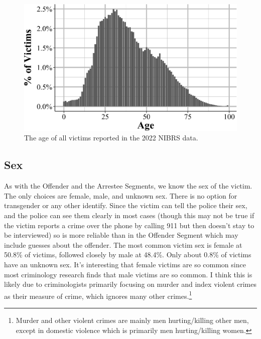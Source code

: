 \documentclass[
  12pt,
  openany]{book}
\begin{document}
\begin{figure}

{\centering \includegraphics[width=0.9\linewidth]{15_nibrs_victim_files/figure-latex/victimAge-1} 

}

\caption{The age of all victims reported in the 2022 NIBRS data.}\label{fig:victimAge}
\end{figure}

\subsection{Sex}\label{sex-2}

As with the Offender and the Arrestee Segments, we know the sex of the victim. The only choices are female, male, and unknown sex. There is no option for transgender or any other identify. Since the victim can tell the police their sex, and the police can see them clearly in most cases (though this may not be true if the victim reports a crime over the phone by calling 911 but then doesn't stay to be interviewed) so is more reliable than in the Offender Segment which may include guesses about the offender. The most common victim sex is female at 50.8\% of victims, followed closely by male at 48.4\%. Only about 0.8\% of victims have an unknown sex. It's interesting that female victims are so common since most criminology research finds that male victims are so common. I think this is likely due to criminologists primarily focusing on murder and index violent crimes as their measure of crime, which ignores many other crimes.\footnote{Murder and other violent crimes are mainly men hurting/killing other men, except in domestic violence which is primarily men hurting/killing women.}
\end{document}
